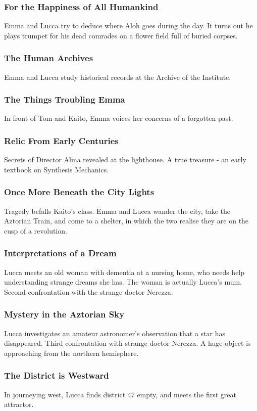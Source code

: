 \documentclass[11pt]{article}
\begin{document}
		\subsubsection{For the Happiness of All Humankind}
		Emma and Lucca try to deduce where Aloh goes during the day.
		It turns out he plays trumpet for his dead comrades on a flower field full of buried corpses.
		\subsubsection{The Human Archives}
		Emma and Lucca study historical records at the Archive of the Institute.
		\subsubsection{The Things Troubling Emma}
		In front of Tom and Kaito, Emma voices her concerns of a forgotten past.
		\subsubsection{Relic From Early Centuries}
		Secrets of Director Alma revealed at the lighthouse.
		A true treasure - an early textbook on Synthesis Mechanics.
		\subsubsection{Once More Beneath the City Lights}
		Tragedy befalls Kaito's class.
		Emma and Lucca wander the city, take the Aztorian Train, and come to a shelter, in which the two realise they are on the cusp of a revolution.
		\subsubsection{Interpretations of a Dream}
		Lucca meets an old woman with dementia at a nursing home, who needs help understanding strange dreams she has. 
		The woman is actually Lucca's mum.
		Second confrontation with the strange doctor Nerezza.
		\subsubsection{Mystery in the Aztorian Sky}
		Lucca investigates an amateur astronomer's observation that a star has disappeared.
		Third confrontation with strange doctor Nerezza.
		A huge object is approaching from the northern hemisphere.
		\subsubsection{The District is Westward}
		In journeying west, Lucca finds district 47 empty, and meets the first great attractor.
\end{document}
